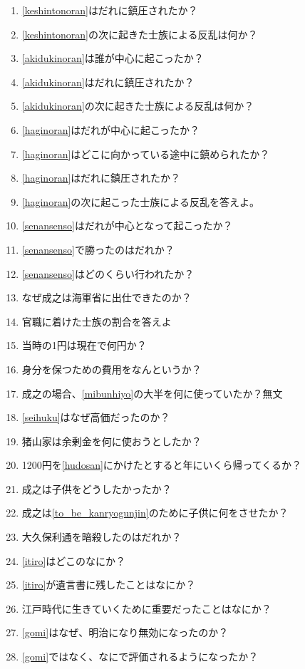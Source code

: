 \documentclass[]{article}
\begin{document}
\begin{enumerate}
	\item \ref{keshintonoran}はだれに鎮圧されたか？
	\item \ref{keshintonoran}の次に起きた士族による反乱は何か？\label{akidukinoran}
	\item \ref{akidukinoran}は誰が中心に起こったか？
	\item \ref{akidukinoran}はだれに鎮圧されたか？
	\item \ref{akidukinoran}の次に起きた士族による反乱は何か？\label{haginoran}
	\item \ref{haginoran}はだれが中心に起こったか？
	\item \ref{haginoran}はどこに向かっている途中に鎮められたか？
	\item \ref{haginoran}はだれに鎮圧されたか？
	\item \ref{haginoran}の次に起こった士族による反乱を答えよ。\label{senansenso}
	\item \ref{senansenso}はだれが中心となって起こったか？
	\item \ref{senansenso}で勝ったのはだれか？
	\item \ref{senansenso}はどのくらい行われたか？
	\item なぜ成之は海軍省に出仕できたのか？
	\item 官職に着けた士族の割合を答えよ
	\item 当時の1円は現在で何円か？
	\item 身分を保つための費用をなんというか？\label{mibunhiyo}
	\item 成之の場合、\ref{mibunhiyo}の大半を何に使っていたか？無文\label{seihuku}
	\item \ref{seihuku}はなぜ高価だったのか？
	\item 猪山家は余剰金を何に使おうとしたか？\label{hudosan}
	\item 1200円を\ref{hudosan}にかけたとすると年にいくら帰ってくるか？
	\item 成之は子供をどうしたかったか？\label{to_be_kanryogunjin}
	\item 成之は\ref{to_be_kanryogunjin}のために子供に何をさせたか？
	\item 大久保利通を暗殺したのはだれか？\label{itiro}
	\item \ref{itiro}はどこのなにか？
	\item \ref{itiro}が遺言書に残したことはなにか？
	\item 江戸時代に生きていくために重要だったことはなにか？\label{gomi}
	\item \ref{gomi}はなぜ、明治になり無効になったのか？
	\item \ref{gomi}ではなく、なにで評価されるようになったか？

\end{enumerate}
\end{document}
